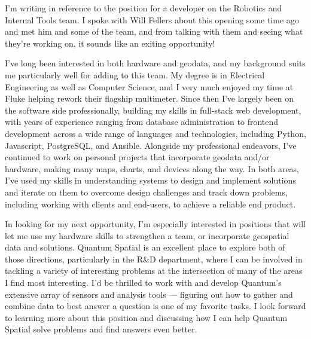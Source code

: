 \documentclass[10pt,stdletter,dateno,sigleft]{newlfm} %
\begin{document}
\begin{newlfm}


I'm writing in reference to the position for a developer on the Robotics and Internal Tools team. I spoke with Will Fellers about this opening some time ago and met him and some of the team, and from talking with them and seeing what they're working on, it sounds like an exiting opportunity!

I've long been interested in both hardware and geodata, and my background suits me particularly well for adding to this team. My degree is in Electrical Engineering as well as Computer Science, and I very much enjoyed my time at Fluke helping rework their flagship multimeter. Since then I've largely been on the software side professionally, building my skills in full-stack web development, with years of experience ranging from database administration to frontend development across a wide range of languages and technologies, including Python, Javascript, PostgreSQL, and Ansible. Alongside my professional endeavors, I've continued to work on personal projects that incorporate geodata and/or hardware, making many maps, charts, and devices along the way. In both areas, I've used my skills in understanding systems to design and implement solutions and iterate on them to overcome design challenges and track down problems, including working with clients and end-users, to achieve a reliable end product.

In looking for my next opportunity, I'm especially interested in positions that will let me use my hardware skills to strengthen a team, or incorporate geospatial data and solutions. Quantum Spatial is an excellent place to explore both of those directions, particularly in the R\&D department, where I can be involved in tackling a variety of interesting problems at the intersection of many of the areas I find most interesting. I'd be thrilled to work with and develop Quantum's extensive array of sensors and analysis tools — figuring out how to gather and combine data to best answer a question is one of my favorite tasks. I look forward to learning more about this position and discussing how I can help Quantum Spatial solve problems and find answers even better.


\end{newlfm}
\end{document}
